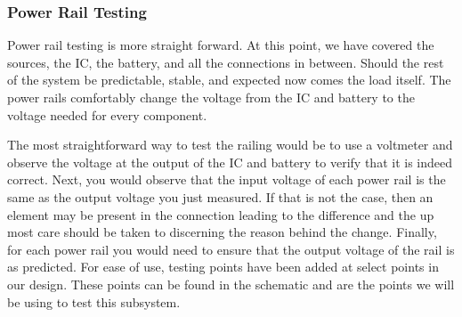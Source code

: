 \subsubsection{Power Rail Testing}
Power rail testing is more straight forward. At this point, we have covered the sources, the IC, the battery, and all the connections in between. Should the rest of the system be predictable, stable, and expected now comes the load itself. The power rails comfortably change the voltage from the IC and battery to the voltage needed for every component. 

The most straightforward way to test the railing would be to use a voltmeter and observe the voltage at the output of the IC and battery to verify that it is indeed correct.
Next, you would observe that the input voltage of each power rail is the same as the output voltage you just measured. If that is not the case, then an element may be present in the connection leading to the difference and the up most care should be taken to discerning the reason behind the change. Finally, for each power rail you would need to ensure that the output voltage of the rail is as predicted. For ease of use, testing points have been added at select points in our design. These points can be found in the schematic and are the points we will be using to test this subsystem.
